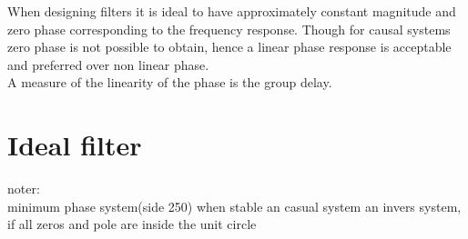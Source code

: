 When designing filters it is ideal to have approximately constant magnitude and zero phase corresponding to the frequency response. Though for causal systems zero phase is not possible to obtain, hence a linear phase response is acceptable and preferred over non linear phase.
\\
A measure of the linearity of the phase is the group delay.\\    


\section{Ideal filter} 

\begin{figure}[H]
\centering
{}
\caption{}
\label{fig:lowpass}
\end{figure}

noter: \\
minimum phase system(side 250) when stable an casual system an invers system, if all zeros and pole are inside the unit circle 